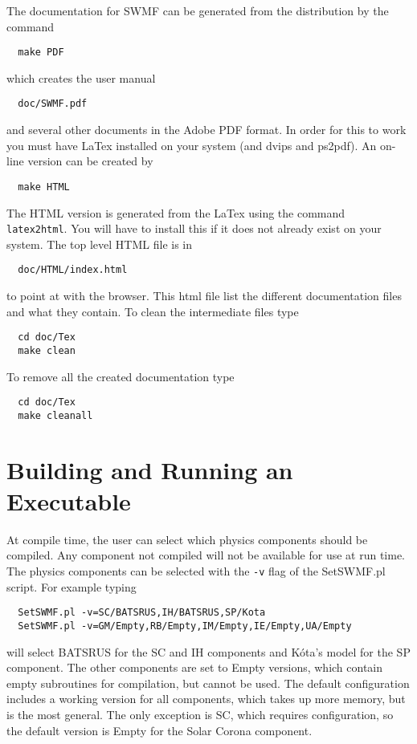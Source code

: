 The documentation for SWMF can be generated from the distribution by
the command
\begin{verbatim}
  make PDF
\end{verbatim}
which creates the user manual
\begin{verbatim}
  doc/SWMF.pdf
\end{verbatim}
and several other documents in the Adobe PDF format.  
In order for this to work you must have
LaTex installed on your system (and dvips and ps2pdf).  
An on-line version can be created by
\begin{verbatim}
  make HTML
\end{verbatim}
The HTML version is generated from the LaTex using the command {\tt
  latex2html}.  You will have to install this if it does not already exist
  on your system.
The top level HTML file is in
\begin{verbatim}
  doc/HTML/index.html
\end{verbatim}
to point at with the browser.  This html file list the different
documentation files and what they contain.  To clean the intermediate files type
\begin{verbatim}
  cd doc/Tex
  make clean
\end{verbatim}
To remove all the created documentation type
\begin{verbatim}
  cd doc/Tex
  make cleanall
\end{verbatim}

\section{Building and Running an Executable}

At compile time, the user can select which physics components should be
compiled.  
Any component not compiled will not be available for
use at run time.  The physics components can be selected with the {\tt -v} flag
of the SetSWMF.pl script. For example typing
\begin{verbatim}
  SetSWMF.pl -v=SC/BATSRUS,IH/BATSRUS,SP/Kota
  SetSWMF.pl -v=GM/Empty,RB/Empty,IM/Empty,IE/Empty,UA/Empty
\end{verbatim}
will select BATSRUS for the SC and IH components and K\'ota's model for
the SP component.
The other components are set to Empty versions, which contain empty
subroutines for compilation, but cannot be used.
The default configuration includes a working version for all components, 
which takes up more memory, but is the most general.
The only exception is SC, which requires configuration, so the 
default version is Empty for the Solar Corona component.

